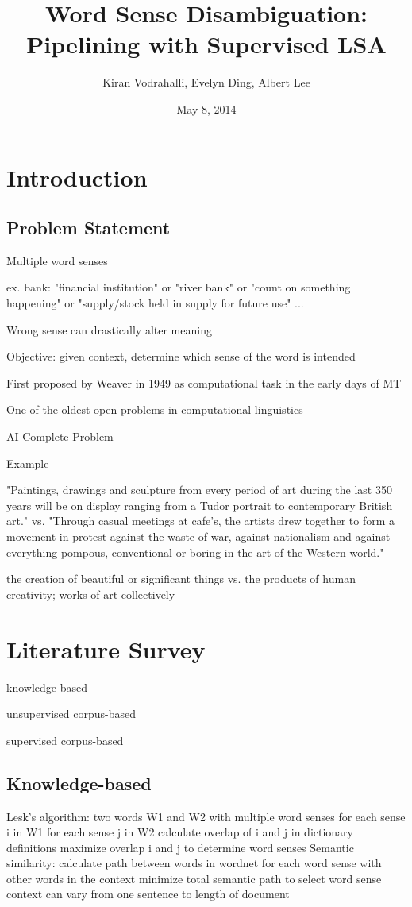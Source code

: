 \documentclass[10pt, letterpaper]{article}
\author{Kiran Vodrahalli, Evelyn Ding, Albert Lee}
\title{Word Sense Disambiguation: Pipelining with Supervised LSA}
\date{May 8, 2014}
\begin{document}
	\maketitle
	
	\section{Introduction}
	\subsection{Problem Statement}
	  Multiple word senses

	  ex. bank: "financial institution" or "river bank" or "count on something happening" or "supply/stock held in supply for future use" ...

	  Wrong sense can drastically alter meaning

	  Objective: given context, determine which sense of the word is intended

	  First proposed by Weaver in 1949 as computational task in the early days of MT

	  One of the oldest open problems in computational linguistics 

	  AI-Complete Problem

	  Example

	  "Paintings, drawings and sculpture from every period of art during the last 350 years will be on display ranging from a Tudor portrait to contemporary British art."
	  vs.
	  "Through casual meetings at cafe's, the artists drew together to form a movement in protest against the waste of war, against nationalism and against everything pompous, conventional or boring in the art of the Western world."


	  the creation of beautiful or significant things 
      vs. 
	  the products of human creativity; works of art collectively 
	\section{Literature Survey}
	knowledge based

	unsupervised corpus-based

	supervised corpus-based
	\subsection{Knowledge-based}
	Lesk's algorithm:
	two words W1 and W2 with multiple word senses
	for each sense i in W1
	for each sense j in W2
	calculate overlap of i and j in dictionary definitions
	maximize overlap i and j to determine word senses
	Semantic similarity:
	calculate path between words in wordnet for each word sense with other words in the context
	minimize total semantic path to select word sense
	context can vary from one sentence to length of document
	
\end{document}
